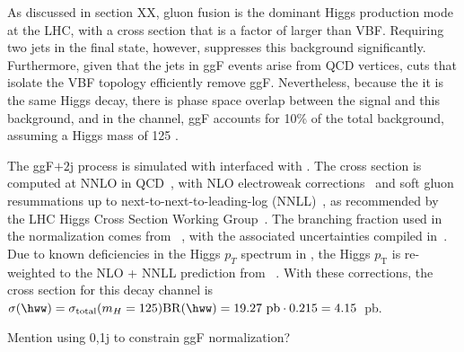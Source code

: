 As discussed in section XX, gluon fusion is the dominant Higgs production mode at the
LHC, with a cross section that is a factor of  larger
than VBF. Requiring two jets in the final state, however, suppresses
this background significantly. Furthermore, given that the jets in ggF
events arise from QCD vertices, cuts that isolate the VBF topology
efficiently remove ggF. Nevertheless, because the it is the same Higgs
decay, there is phase space overlap between the signal and this
background, and in the \emme channel, ggF accounts for 10\% of the
total background, assuming a Higgs mass of 125 \GeV.

The ggF$+2$j process is simulated with \POWHEG interfaced with
. The cross section is computed at NNLO in
QCD~\cite{Djouadi:1991tka,Dawson:1990zj,Spira:1995rr,Harlander:2002wh,Anastasiou:2002yz,Ravindran:2003um},
with NLO electroweak corrections~\cite{Aglietti:2004nj,Actis:2008ug}
and soft gluon resummations up to
next-to-next-to-leading-log (NNLL)~\cite{Catani:2003zt}, as recommended by
the LHC Higgs Cross Section Working
Group~\cite{bib:Dittmaier:2011ti,bib:Dittmaier:2012vm,bib:Heinemeyer:2013tqa}. The
branching fraction used in the normalization comes from
\hdecay~\cite{Djouadi:1997yw}, with the associated uncertainties
compiled
in~\cite{bib:Dittmaier:2011ti,bib:Dittmaier:2012vm}. Due
to known deficiencies in the Higgs $p_T$ spectrum in \POWHEG, the
Higgs $p_{\mathrm{T}}$ is re-weighted to the NLO + NNLL prediction
from \HqT~\cite{deFlorian:2011xf}. With these corrections, the cross
section for this decay channel is $\sigma({\hww}) =
\sigma_{\mathrm{total}}(m_H = 125)\mathrm{BR}(\hww) =
19.27~\mathrm{pb}\cdot{0.215} = 4.15$~pb.

Mention using 0,1j to constrain ggF normalization?



